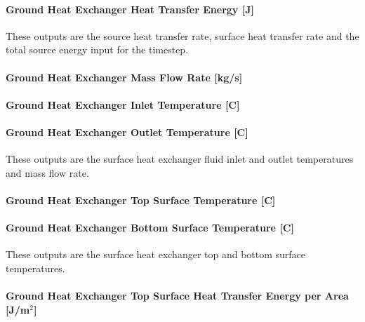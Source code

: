 \paragraph{Ground Heat Exchanger Heat Transfer Energy {[}J{]}}\label{ground-heat-exchanger-heat-transfer-energy-j}

These outputs are the source heat transfer rate, surface heat transfer rate and the total source energy input for the timestep.

\paragraph{Ground Heat Exchanger Mass Flow Rate {[}kg/s{]}}\label{ground-heat-exchanger-mass-flow-rate-kgs-2}

\paragraph{Ground Heat Exchanger Inlet Temperature {[}C{]}}\label{ground-heat-exchanger-inlet-temperature-c-2}

\paragraph{Ground Heat Exchanger Outlet Temperature {[}C{]}}\label{ground-heat-exchanger-outlet-temperature-c-2}

These outputs are the surface heat exchanger fluid inlet and outlet temperatures and mass flow rate.

\paragraph{Ground Heat Exchanger Top Surface Temperature {[}C{]}}\label{ground-heat-exchanger-top-surface-temperature-c}

\paragraph{Ground Heat Exchanger Bottom Surface Temperature {[}C{]}}\label{ground-heat-exchanger-bottom-surface-temperature-c}

These outputs are the surface heat exchanger top and bottom surface temperatures.

\paragraph{Ground Heat Exchanger Top Surface Heat Transfer Energy per Area~ {[}J/m\(^{2}\){]}}\label{ground-heat-exchanger-top-surface-heat-transfer-energy-per-area-jm2}

